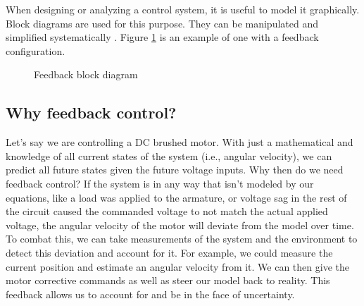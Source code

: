 When designing or analyzing a control system, it is useful to model it
graphically. Block diagrams are used for this purpose. They can be manipulated
and simplified systematically \cite{bib:block_diagrams}. Figure
\ref{fig:feedback_loop} is an example of one with a feedback configuration.

\begin{figure}[H]
  \centering


  \caption{Feedback block diagram}
  \label{fig:feedback_loop}
\end{figure}

\subsection{Why feedback control?}

Let's say we are controlling a DC brushed motor. With just a mathematical
 and knowledge of all current \glspl{state}
of the \gls{system} (i.e., angular velocity), we can predict all future
\glspl{state} given the future voltage \glspl{input}. Why then do we need
feedback control? If the system is  in any way
that isn't modeled by our equations, like a load was applied to the armature, or
voltage sag in the rest of the circuit caused the commanded voltage to not match
the actual applied voltage, the angular velocity of the motor will deviate from
the \gls{model} over time. \\

To combat this, we can take measurements of the system and the environment to
detect this deviation and account for it. For example, we could measure the
current position and estimate an angular velocity from it. We can then give the
motor corrective commands as well as steer our \gls{model} back to reality. This
feedback allows us to account for and be  in the
face of uncertainty.

